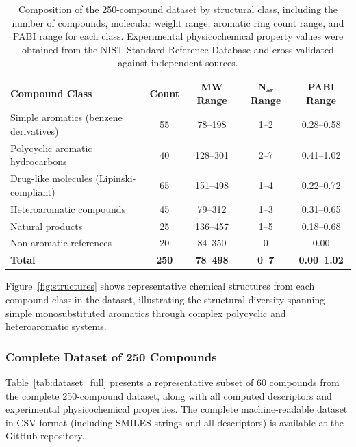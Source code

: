 \documentclass[12pt,a4paper]{article}
\begin{document}
\begin{table}[H]
\centering
\caption{Composition of the 250-compound dataset by structural class, including the number of compounds, molecular weight range, aromatic ring count range, and PABI range for each class. Experimental physicochemical property values were obtained from the NIST Standard Reference Database\cite{nist2024} and cross-validated against independent sources.}
\label{tab:dataset_composition}
\begin{tabular}{@{}lcccc@{}}
\toprule
\textbf{Compound Class} & \textbf{Count} & \textbf{MW Range} & $\mathbf{N_{\text{ar}}}$ \textbf{Range} & \textbf{PABI Range} \\
\midrule
Simple aromatics (benzene derivatives) & 55 & 78--198 & 1--2 & 0.28--0.58 \\
Polycyclic aromatic hydrocarbons & 40 & 128--301 & 2--7 & 0.41--1.02 \\
Drug-like molecules (Lipinski-compliant) & 65 & 151--498 & 1--4 & 0.22--0.72 \\
Heteroaromatic compounds & 45 & 79--312 & 1--3 & 0.31--0.65 \\
Natural products & 25 & 136--457 & 1--5 & 0.18--0.68 \\
Non-aromatic references & 20 & 84--350 & 0 & 0.00 \\
\midrule
\textbf{Total} & \textbf{250} & \textbf{78--498} & \textbf{0--7} & \textbf{0.00--1.02} \\
\bottomrule
\end{tabular}
\end{table}

Figure~\ref{fig:structures} shows representative chemical structures from each compound class in the dataset, illustrating the structural diversity spanning simple monosubstituted aromatics through complex polycyclic and heteroaromatic systems.

\subsubsection{Complete Dataset of 250 Compounds}

Table~\ref{tab:dataset_full} presents a representative subset of 60 compounds from the complete 250-compound dataset, along with all computed descriptors and experimental physicochemical properties. The complete machine-readable dataset in CSV format (including SMILES strings and all descriptors) is available at the GitHub repository.

\vspace{0.3cm}
\end{document}
